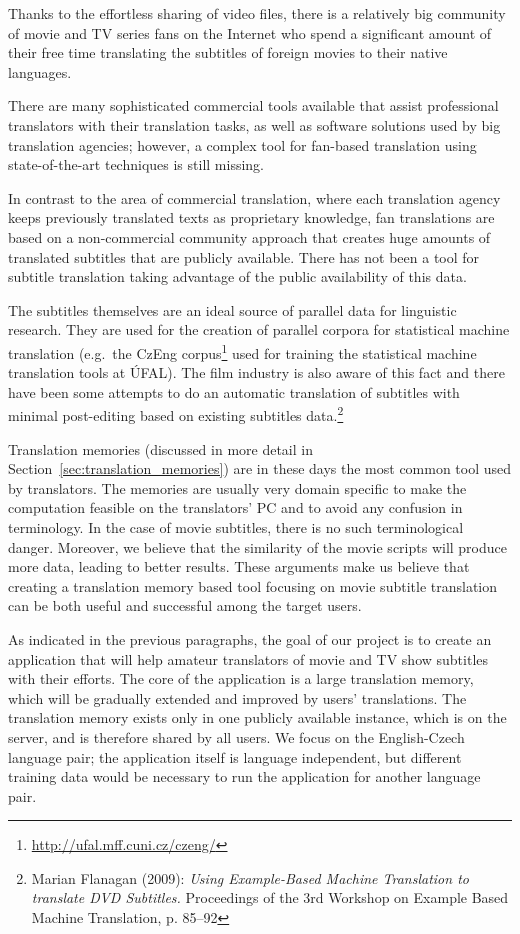 Thanks to the effortless sharing of video files, there is a relatively big community of movie and TV series fans on the Internet who spend a significant amount of their free time translating the subtitles of foreign movies to their native languages.


There are many sophisticated commercial tools available that assist professional translators with their translation tasks, as well as software solutions used by big translation agencies; however, a complex tool for fan-based translation using  state-of-the-art techniques is still missing.

In contrast to the area of commercial translation, where each translation agency keeps previously translated texts as proprietary knowledge, fan translations are based on a non-commercial community approach that creates huge amounts of translated subtitles that are publicly available. There has not been a tool for subtitle translation taking advantage of the public availability of this data.

The subtitles themselves are an ideal source of parallel data for linguistic research. They are used for the creation of  parallel corpora for statistical machine translation (e.g.\ the CzEng corpus\footnote{\url{http://ufal.mff.cuni.cz/czeng/}} used for training the statistical machine translation tools at ÚFAL). The film industry is also aware of this fact and there have been some attempts to do an automatic translation of  subtitles  with minimal post-editing based on existing subtitles data.\footnote{Marian Flanagan (2009): \emph{Using Example-Based Machine Translation to translate DVD Subtitles.} Proceedings of the 3rd Workshop on Example Based Machine Translation, p. 85–92}

Translation memories (discussed in more detail in Section~\ref{sec:translation_memories}) are in these days the most common tool used by translators. The memories are usually very domain specific to make the computation feasible on the translators' PC and to avoid any confusion in terminology. In the case of movie subtitles, there is no such terminological danger. Moreover, we believe that the similarity of the movie scripts will produce more data, leading to better results. These arguments make us believe that creating a translation memory based tool focusing on movie subtitle translation can be both useful and successful among the target users.

As indicated in the previous paragraphs, the goal of our project is to create an application that will help amateur translators of movie and TV show subtitles with their efforts. The core of the application is a large translation memory, which will be gradually extended and improved by users' translations. The translation memory exists only in one publicly available instance, which is on the server, and is therefore shared by all users. We focus on the English-Czech language pair; the application itself is language independent,
but different training data would be necessary
to run the application for another language pair.

